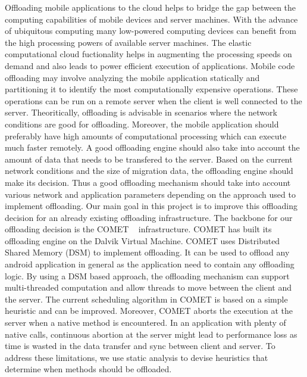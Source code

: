 Offloading mobile applications to the cloud helps to bridge the gap between the computing capabilities
of mobile devices and server machines. With the advance of ubiquitous computing many low-powered computing
devices can benefit from the high processing powers of available server machines. The elastic computational
cloud fuctionality helps in augmenting the processing speeds on demand and also leads to power efficient execution
of applications.
\newline
Mobile code offloading may involve analyzing the mobile application statically and partitioning it to identify the
most computationally expensive operations. These operations can be run on a remote server when the client is well
connected to the server. Theoritically, offloading is advisable in scenarios where the network conditions are good
for offloading. Moreover, the mobile application should preferably have high amounts of computational processing
which can execute much faster remotely. A good offloading engine should also take into account the amount of data that
needs to be transfered to the server. Based on the current network conditions and the size of migration data, the offloading
engine should make its decision. Thus a good offloading mechanism should take into account various network and application
parameters depending on the approach used to implement offloading. Our main goal in this project is to improve this offloading
decision for an already existing offloading infrastructure.
\newline
The backbone for our offloading decision is the COMET ~\cite{comet} infrastructure. COMET has built its offloading engine
on the Dalvik Virtual Machine. COMET uses Distributed Shared Memory (DSM) to implement offloading. It can be used to offload
any android application in general as the application need to contain any offloading logic. By using a DSM based approach, the
offloading mechanism can support multi-threaded computation and allow threads to move between the client and the server.
The current scheduling algorithm in COMET is based on a simple heuristic and can be improved. Moreover, COMET aborts the
execution at the server when a native method is encountered. In an application with plenty of native calls, continuous abortion
at the server might lead to performance loss as time is wasted in the data transfer and sync between client and server.
To address these limitations, we use static analysis to devise heuristics that determine when methods should be offloaded.
\newline
\newline

